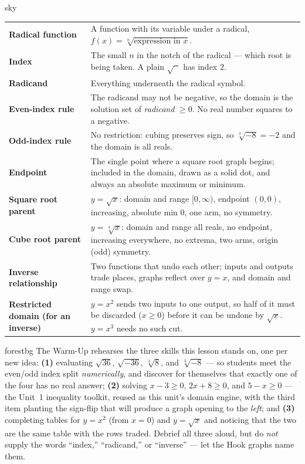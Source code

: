 \documentclass[10pt]{article}
\begin{document}
\begin{skillbox}{sky}
\renewcommand{\arraystretch}{1.3}
\begin{tabularx}{\linewidth}{@{}l X@{}}
\textbf{Radical function} & A function with its variable under a radical, $f(x)=\sqrt[n]{\text{expression in }x}$. \\
\textbf{Index} & The small $n$ in the notch of the radical --- which root is being taken. A plain $\sqrt{\phantom{x}}$ has index $2$. \\
\textbf{Radicand} & Everything underneath the radical symbol. \\
\textbf{Even-index rule} & The radicand may not be negative, so the domain is the solution set of \emph{radicand} $\ge 0$. No real number squares to a negative. \\
\textbf{Odd-index rule} & No restriction: cubing preserves sign, so $\sqrt[3]{-8}=-2$ and the domain is all reals. \\
\textbf{Endpoint} & The single point where a square root graph begins; included in the domain, drawn as a solid dot, and always an absolute maximum or minimum. \\
\textbf{Square root parent} & $y=\sqrt{x}$: domain and range $[0,\infty)$, endpoint $(0,0)$, increasing, absolute min $0$, one arm, no symmetry. \\
\textbf{Cube root parent} & $y=\sqrt[3]{x}$: domain and range all reals, no endpoint, increasing everywhere, no extrema, two arms, origin (odd) symmetry. \\
\textbf{Inverse relationship} & Two functions that undo each other; inputs and outputs trade places, graphs reflect over $y=x$, and domain and range swap. \\
\textbf{Restricted domain (for an inverse)} & $y=x^2$ sends two inputs to one output, so half of it must be discarded ($x\ge0$) before it can be undone by $\sqrt{x}$. $y=x^3$ needs no such cut. \\
\end{tabularx}
\end{skillbox}

\begin{fixedskillbox}{forestbg}
    The Warm-Up rehearses the three skills this lesson stands on, one per new idea: \textbf{(1)}
    evaluating $\sqrt{36}$, $\sqrt{-36}$, $\sqrt[3]{8}$, and $\sqrt[3]{-8}$ --- so students meet the
    even/odd index split \emph{numerically}, and discover for themselves that exactly one of the four
    has no real answer; \textbf{(2)} solving $x-3\ge0$, $2x+8\ge0$, and $5-x\ge0$ --- the Unit~1
    inequality toolkit, reused as this unit's domain engine, with the third item planting the
    sign-flip that will produce a graph opening to the \emph{left}; and \textbf{(3)} completing
    tables for $y=x^2$ (from $x=0$) and $y=\sqrt{x}$ and noticing that the two are the same table with
    the rows traded. Debrief all three aloud, but do \emph{not} supply the words ``index,''
    ``radicand,'' or ``inverse'' --- let the Hook graphs name them.
\end{fixedskillbox}
\end{document}
